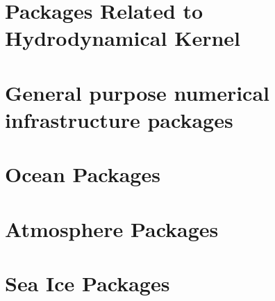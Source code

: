 \newpage


\newpage
\section{Packages Related to Hydrodynamical Kernel}


\newpage


\newpage


\newpage


\newpage



\section{General purpose numerical infrastructure packages}

\newpage


\newpage


\newpage


\newpage
\section{Ocean Packages}


\newpage


\newpage


\newpage


\newpage


\newpage


\newpage


\section{Atmosphere Packages}
\newpage


\newpage


\newpage


\section{Sea Ice Packages}
\newpage


